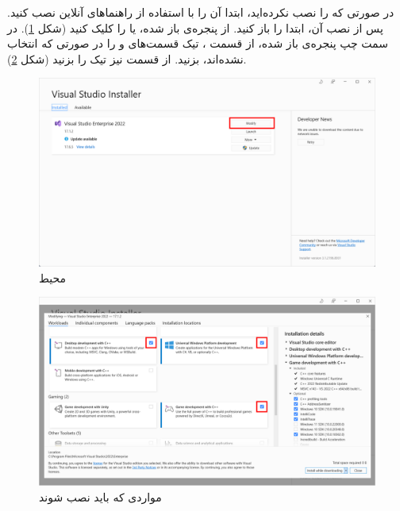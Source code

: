 {
    \Large
    \begin{spacing}{1.5}
        در صورتی که  را نصب نکرده‌اید، ابتدا آن را با استفاده از راهنما‌های آنلاین نصب کنید. پس از نصب آن، ابتدا  را باز کنید. از پنجره‌ی باز شده،  یا  را کلیک کنید (شکل \ref{fig:3.Intro.2.1}). در سمت چپ پنجره‌ی باز شده، از قسمت ، تیک قسمت‌های  و  را در صورتی که انتخاب نشده‌اند، بزنید.
        از قسمت  نیز تیک  را بزنید (شکل \ref{fig:3.Intro.2.2}).

        \begin{figure}[H]
            \centering
            \setlength{\belowcaptionskip}{-10pt}

            \includegraphics[width=\textwidth]{Images/3/3.Intro.2.1}
            \caption{محیط }
            \label{fig:3.Intro.2.1}
        \end{figure}

        \begin{figure}[H]
            \centering
            \setlength{\belowcaptionskip}{-10pt}
            \includegraphics[width=\textwidth]{Images/3/3.Intro.2.2}
            \caption{مواردی که باید نصب شوند}
            \label{fig:3.Intro.2.2}
        \end{figure}


\end{spacing}}
